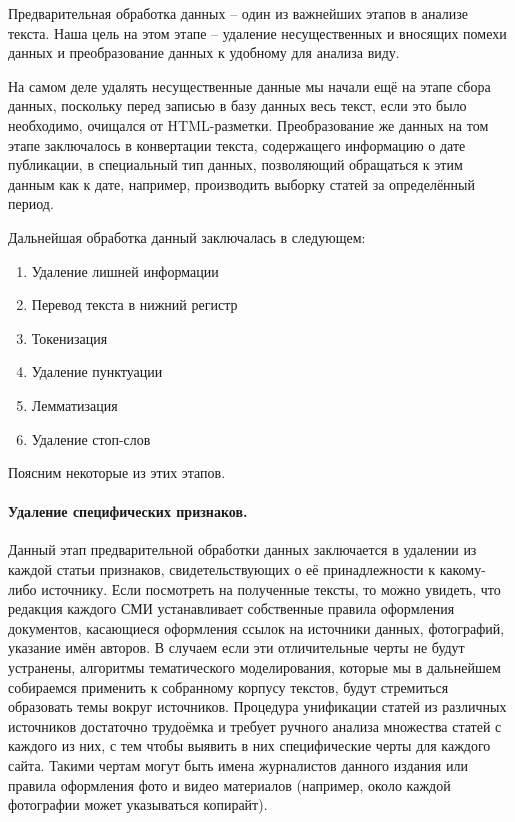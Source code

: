 Предварительная обработка данных -- один из важнейших этапов в анализе текста. Наша цель на этом этапе -- удаление несущественных и вносящих помехи данных и преобразование данных к удобному для анализа виду.

На самом деле удалять несущественные данные мы начали ещё на этапе сбора данных, поскольку перед записью в базу данных весь текст, если это было необходимо, очищался от HTML-разметки. Преобразование же данных на том этапе заключалось в конвертации текста, содержащего информацию о дате публикации, в специальный тип данных, позволяющий обращаться к этим данным как к дате, например, производить выборку статей за определённый период.

Дальнейшая обработка данный заключалась в следующем:

\begin{enumerate}
\item Удаление лишней информации
\item Перевод текста в нижний регистр
\item Токенизация
\item Удаление пунктуации
\item Лемматизация
\item Удаление стоп-слов
\end{enumerate}
Поясним некоторые из этих этапов.

\paragraph{Удаление специфических признаков.}
Данный этап предварительной обработки данных заключается в удалении из каждой статьи признаков, свидетельствующих о её принадлежности к какому-либо источнику. Если посмотреть на полученные тексты, то можно увидеть, что редакция каждого СМИ устанавливает собственные правила оформления документов, касающиеся оформления ссылок на источники данных, фотографий, указание имён авторов. В случаем если эти отличительные черты не будут устранены, алгоритмы тематического моделирования, которые мы в дальнейшем собираемся применить к собранному корпусу текстов, будут стремиться образовать темы вокруг источников. Процедура унификации статей из различных источников достаточно трудоёмка и требует ручного анализа множества статей с каждого из них, с тем чтобы выявить в них специфические черты для каждого сайта. Такими чертам могут быть имена журналистов данного издания или правила оформления фото и видео материалов (например, около каждой фотографии может указываться копирайт).

